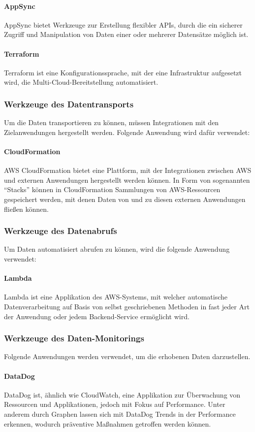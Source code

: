 \paragraph{AppSync} 
AppSync bietet Werkzeuge zur Erstellung flexibler APIs, durch die ein sicherer Zugriff und Manipulation von Daten einer oder mehrerer Datensätze möglich ist. 
\paragraph{Terraform} 
Terraform ist eine Konfigurationssprache, mit der eine Infrastruktur aufgesetzt wird, die Multi-Cloud-Bereitstellung automatisiert. \cite{HashiCorp2024} 
\subsubsection{Werkzeuge des Datentransports}
Um die Daten transportieren zu können, müssen Integrationen mit den Zielanwendungen hergestellt werden. Folgende Anwendung wird dafür verwendet:
\paragraph{CloudFormation}
AWS CloudFormation bietet eine Plattform, mit der Integrationen zwischen AWS und externen Anwendungen hergestellt werden können. In Form von sogenannten ``Stacks'' können in CloudFormation Sammlungen von AWS-Ressourcen gespeichert werden, mit denen Daten von und zu diesen externen Anwendungen fließen können.
\subsubsection{Werkzeuge des Datenabrufs}
Um Daten automatisiert abrufen zu können, wird die folgende Anwendung verwendet:
\paragraph{Lambda}
Lambda ist eine Applikation des AWS-Systems, mit welcher automatische Datenverarbeitung auf Basis von selbst geschriebenen Methoden in fast jeder Art der Anwendung oder jedem Backend-Service ermöglicht wird. \cite{AWS2024d} 
 
 \subsubsection{Werkzeuge des Daten-Monitorings}
Folgende Anwendungen werden verwendet, um die erhobenen Daten darzustellen.
\paragraph{DataDog} 
DataDog ist, ähnlich wie CloudWatch, eine Applikation zur Überwachung von Ressourcen und Applikationen, jedoch mit Fokus auf Performance. Unter anderem durch Graphen lassen sich mit DataDog Trends in der Performance erkennen, wodurch präventive Maßnahmen getroffen werden können. \cite{DataDog2024} 
